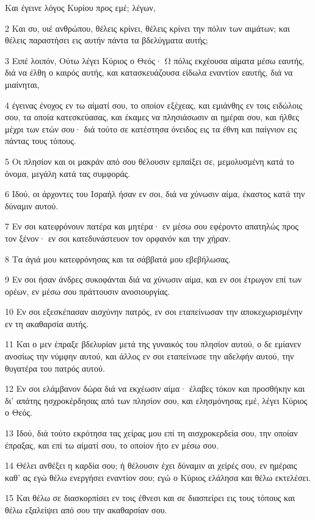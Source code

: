 \par Και έγεινε λόγος Κυρίου προς εμέ; λέγων,
\par 2 Και συ, υιέ ανθρώπου, θέλεις κρίνει, θέλεις κρίνει την πόλιν των αιμάτων; και θέλεις παραστήσει εις αυτήν πάντα τα βδελύγματα αυτής;
\par 3 Ειπέ λοιπόν, Ούτω λέγει Κύριος ο Θεός· Ω πόλις εκχέουσα αίματα μέσω εαυτής, διά να έλθη ο καιρός αυτής, και κατασκευάζουσα είδωλα εναντίον εαυτής, διά να μιαίνηται,
\par 4 έγεινας ένοχος εν τω αίματί σου, το οποίον εξέχεας, και εμιάνθης εν τοις ειδώλοις σου, τα οποία κατεσκεύασας, και έκαμες να πλησιάσωσιν αι ημέραι σου, και ήλθες μέχρι των ετών σου· διά τούτο σε κατέστησα όνειδος εις τα έθνη και παίγνιον εις πάντας τους τόπους.
\par 5 Οι πλησίον και οι μακράν από σου θέλουσιν εμπαίξει σε, μεμολυσμένη κατά το όνομα, μεγάλη κατά τας συμφοράς.
\par 6 Ιδού, οι άρχοντες του Ισραήλ ήσαν εν σοι, διά να χύνωσιν αίμα, έκαστος κατά την δύναμιν αυτού.
\par 7 Εν σοι κατεφρόνουν πατέρα και μητέρα· εν μέσω σου εφέροντο απατηλώς προς τον ξένον· εν σοι κατεδυνάστευον τον ορφανόν και την χήραν.
\par 8 Τα άγιά μου κατεφρόνησας και τα σάββατά μου εβεβήλωσας.
\par 9 Εν σοι ήσαν άνδρες συκοφάνται διά να χύνωσιν αίμα, και εν σοι έτρωγον επί των ορέων, εν μέσω σου πράττουσιν ανοσιουργίας.
\par 10 Εν σοι εξεσκέπασαν αισχύνην πατρός, εν σοι εταπείνωσαν την αποκεχωρισμένην εν τη ακαθαρσία αυτής.
\par 11 Και ο μεν έπραξε βδελυρίαν μετά της γυναικός του πλησίον αυτού, ο δε εμίανεν ανοσίως την νύμφην αυτού, και άλλος εν σοι εταπείνωσε την αδελφήν αυτού, την θυγατέρα του πατρός αυτού.
\par 12 Εν σοι ελάμβανον δώρα διά να εκχέωσιν αίμα· έλαβες τόκον και προσθήκην και δι' απάτης ησχροκέρδησας από των πλησίον σου, και ελησμόνησας εμέ, λέγει Κύριος ο Θεός.
\par 13 Ιδού, διά τούτο εκρότησα τας χείρας μου επί τη αισχροκερδεία σου, την οποίαν έπραξας, και επί τω αίματί σου, το οποίον ήτο εν μέσω σου.
\par 14 Θέλει ανθέξει η καρδία σου; ή θέλουσιν έχει δύναμιν αι χείρές σου, εν ημέραις καθ' ας εγώ θέλω ενεργήσει εναντίον σου; εγώ ο Κύριος ελάλησα και θέλω εκτελέσει.
\par 15 Και θέλω σε διασκορπίσει εν τοις έθνεσι και σε διασπείρει εις τους τόπους και θέλω εξαλείψει από σου την ακαθαρσίαν σου.

